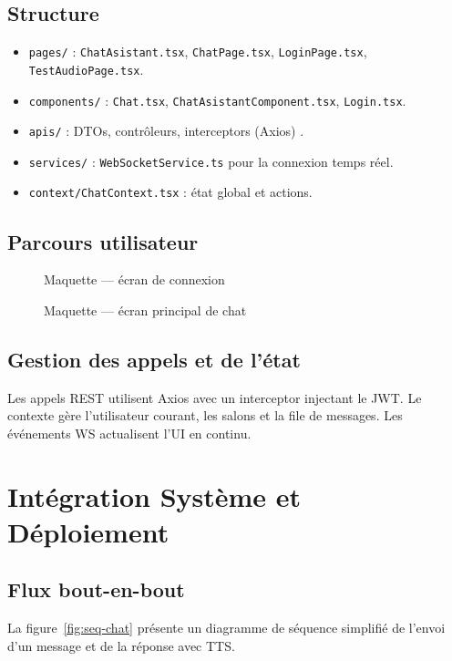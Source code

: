 \documentclass[12pt,a4paper]{report}
\begin{document}
\section{Structure}
\begin{itemize}[leftmargin=*,nosep]
  \item \texttt{pages/} : \texttt{ChatAsistant.tsx}, \texttt{ChatPage.tsx}, \texttt{LoginPage.tsx}, \texttt{TestAudioPage.tsx}.
  \item \texttt{components/} : \texttt{Chat.tsx}, \texttt{ChatAsistantComponent.tsx}, \texttt{Login.tsx}.
  \item \texttt{apis/} : DTOs, contrôleurs, interceptors (Axios) \cite{reactdocs}.
  \item \texttt{services/} : \texttt{WebSocketService.ts} pour la connexion temps réel.
  \item \texttt{context/ChatContext.tsx} : état global et actions.
\end{itemize}

\section{Parcours utilisateur}
\begin{figure}[H]
  \centering
  
  \caption{Maquette --- écran de connexion}
\end{figure}

\begin{figure}[H]
  \centering
  
  \caption{Maquette --- écran principal de chat}
\end{figure}

\section{Gestion des appels et de l'état}
Les appels REST utilisent Axios avec un interceptor injectant le JWT. Le contexte gère l'utilisateur courant, les salons et la file de messages. Les événements \ac{WS} actualisent l'UI en continu.

\chapter{Intégration Système et Déploiement}
\section{Flux bout-en-bout}
La figure~\ref{fig:seq-chat} présente un diagramme de séquence simplifié de l'envoi d'un message et de la réponse avec \ac{TTS}.
\end{document}
